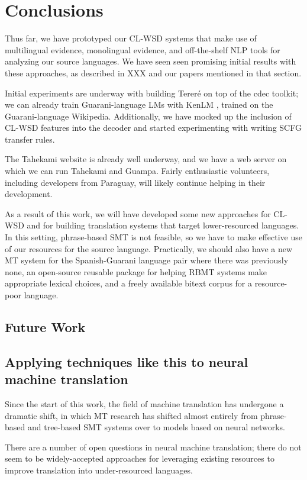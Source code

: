 \chapter{Conclusions}
\label{chap:conclusions}
Thus far, we have prototyped our CL-WSD systems that make use of multilingual
evidence, monolingual evidence, and off-the-shelf NLP tools for analyzing our
source languages.
We have seen seen promising initial results with these approaches, as described
in XXX and our papers mentioned in that section.

Initial experiments are underway with building Tereré on top of the cdec
toolkit; we can already train Guarani-language LMs with KenLM
\cite{Heafield-estimate}, trained on the Guarani-language Wikipedia.
Additionally, we have mocked up the inclusion of CL-WSD features into the
decoder and started experimenting with writing SCFG transfer rules.

The Tahekami website is already well underway, and we have a web server on
which we can run Tahekami and Guampa. Fairly enthusiastic volunteers, including
developers from Paraguay, will likely continue helping in their development.

As a result of this work, we will have developed some new approaches for
CL-WSD and for building translation systems that target lower-resourced
languages. In this setting, phrase-based SMT is not feasible, so we have to
make effective use of our resources for the source language.
Practically, we should also have a new MT system for the Spanish-Guarani
language pair where there was previously none, an open-source reusable
package for helping RBMT systems make appropriate lexical choices, and a freely
available bitext corpus for a resource-poor language.

\section{Future Work}

\section{Applying techniques like this to neural machine translation}
Since the start of this work, the field of machine translation has undergone a
dramatic shift, in which MT research has shifted almost entirely from
phrase-based and tree-based SMT systems over to models based on neural
networks.

There are a number of open questions in neural machine translation; there do
not seem to be widely-accepted approaches for leveraging existing resources to
improve translation into under-resourced languages.


